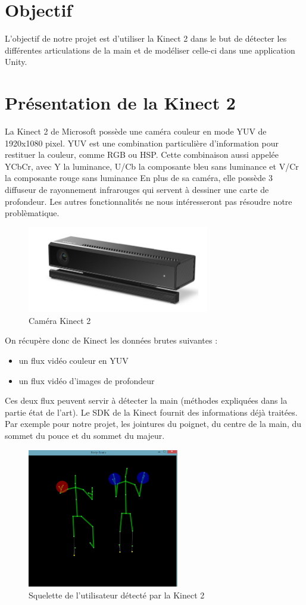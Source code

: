 \section{Objectif}
L'objectif de notre projet est d'utiliser la Kinect 2 dans le but de détecter les différentes articulations
de la main et de modéliser celle-ci dans une application Unity.

\section{Présentation de la Kinect 2}
La Kinect 2 de Microsoft possède une caméra couleur en mode YUV de 1920x1080 pixel.
YUV est une combination particulière d'information pour restituer la couleur, comme RGB ou HSP.
Cette combinaison aussi appelée YCbCr, avec Y la luminance, U/Cb la composante bleu sans luminance et V/Cr la composante rouge sans luminance
En plus de sa caméra, elle possède 3 diffuseur de rayonnement infrarouges qui servent à dessiner une carte de profondeur.
Les autres fonctionnalités ne nous intéresseront pas résoudre notre problèmatique.\\

\begin{figure}[!h]
 \center
 \includegraphics[width=300px]{images/kinect-v2.png}
 \caption{Caméra Kinect 2}
\end{figure}

On récupère donc de Kinect les données brutes suivantes : 
\begin{itemize}
 \item un flux vidéo couleur en YUV
 \item un flux vidéo d'images de profondeur
\end{itemize}

Ces deux flux peuvent servir à détecter la main (méthodes expliquées dans la partie état de l'art).
Le SDK de la Kinect fournit des informations déjà traitées. 
Par exemple pour notre projet, les jointures du poignet, du centre de la main, du sommet du pouce et du sommet du majeur.

\begin{figure}[!h]
\center
\includegraphics[width=250px]{images/kinec2_skel.png}
\caption{Squelette de l'utilisateur détecté par la Kinect 2}
\end{figure}

